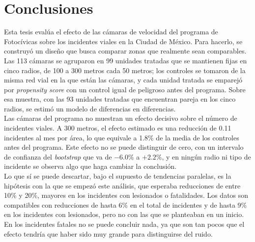 \chapter*{Conclusiones}

\noindent Esta tesis evalúa el efecto de las cámaras de velocidad del programa de Fotocívicas sobre los incidentes viales en la Ciudad de México. Para hacerlo, se construyó un diseño que busca comparar zonas que realmente sean comparables. Las 113 cámaras se agruparon en 99 unidades tratadas que se mantienen fijas en cinco radios, de 100 a 300 metros cada 50 metros; los controles se tomaron de la misma red vial en la que están las cámaras, y cada unidad tratada se emparejó por \emph{propensity score} con un control igual de peligroso antes del programa. Sobre esa muestra, con las 93 unidades tratadas que encuentran pareja en los cinco radios, se estimó un modelo de diferencias en diferencias.\\

Las cámaras del programa no muestran un efecto decisivo sobre el número de incidentes viales. A 300 metros, el efecto estimado es una reducción de 0.11 incidentes al mes por área, lo que equivale a 1.8\% de la media de los controles antes del programa. Este efecto no se puede distinguir de cero, con un intervalo de confianza del \emph{bootstrap} que va de $-6.0\%$ a $+2.2\%$, y en ningún radio ni tipo de incidente se observa algo que haga cambiar la conclusión.\\

Lo que sí se puede descartar, bajo el supuesto de tendencias paralelas, es la hipótesis con la que se empezó este análisis, que esperaba reducciones de entre 10\% y 20\%, mayores en los incidentes con lesionados o fatalidades. Los datos son compatibles con reducciones de hasta 6\% en el total de incidentes y de hasta 9\% en los incidentes con lesionados, pero no con las que se planteaban en un inicio. En los incidentes fatales no se puede concluir nada, ya que son tan pocos que el efecto tendría que haber sido muy grande para distinguirse del ruido.\\

